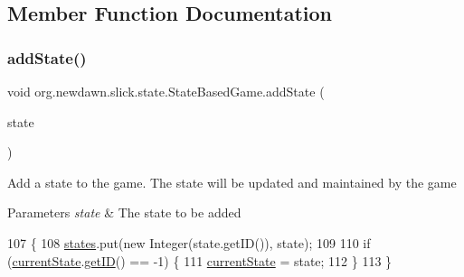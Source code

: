 \subsection{Member Function Documentation}
\mbox{\label{classorg_1_1newdawn_1_1slick_1_1state_1_1_state_based_game_acfd4acadb4a4f79fddd7e76250da37dc}} 
\subsubsection{\texorpdfstring{add\+State()}{addState()}}
{\footnotesize\ttfamily void org.\+newdawn.\+slick.\+state.\+State\+Based\+Game.\+add\+State (\begin{DoxyParamCaption}\item[{\mbox{\hyperlink{interfaceorg_1_1newdawn_1_1slick_1_1state_1_1_game_state}{Game\+State}}}]{state }\end{DoxyParamCaption})\hspace{0.3cm}{\ttfamily [inline]}}

Add a state to the game. The state will be updated and maintained by the game


\begin{DoxyParams}{Parameters}
{\em state} & The state to be added \\
\hline
\end{DoxyParams}

\begin{DoxyCode}
107                                           \{
108         \mbox{\hyperlink{namespacestates}{states}}.put(\textcolor{keyword}{new} Integer(state.getID()), state);
109         
110         \textcolor{keywordflow}{if} (\mbox{\hyperlink{classorg_1_1newdawn_1_1slick_1_1state_1_1_state_based_game_a6a45e68094bb9b7ec30b8a8b7d415766}{currentState}}.\mbox{\hyperlink{interfaceorg_1_1newdawn_1_1slick_1_1state_1_1_game_state_a54f2bc6a91feaf0614a5ef19f1d03313}{getID}}() == -1) \{
111             \mbox{\hyperlink{classorg_1_1newdawn_1_1slick_1_1state_1_1_state_based_game_a6a45e68094bb9b7ec30b8a8b7d415766}{currentState}} = state;
112         \}
113     \}
\end{DoxyCode}
\mbox{\label{classorg_1_1newdawn_1_1slick_1_1state_1_1_state_based_game_af31408ebd2398cc30cbf77a3580cc3f3}} 
